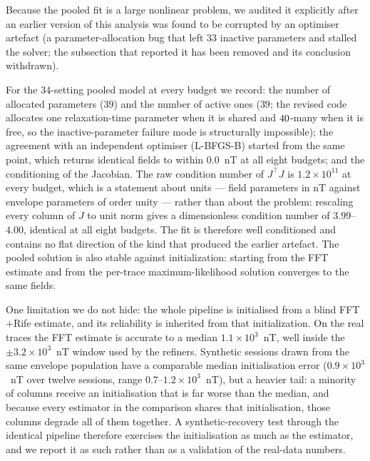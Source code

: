 \documentclass[aps,pra,twocolumn,superscriptaddress,nofootinbib]{revtex4-2}
\begin{document}
Because the pooled fit is a large nonlinear problem, we audited it explicitly after an
earlier version of this analysis was found to be corrupted by an optimiser artefact (a
parameter-allocation bug that left $33$ inactive parameters and stalled the solver; the
subsection that reported it has been removed and its conclusion withdrawn).

For the $34$-setting pooled model at every budget we record: the number of allocated
parameters ($39$) and the number of active ones ($39$; the revised code allocates one
relaxation-time parameter when it is shared and $40$-many when it is free, so the
inactive-parameter failure mode is structurally impossible); the agreement with an
independent optimiser (L-BFGS-B) started from the same point, which returns identical
fields to within $0.0$~nT at all eight budgets; and the conditioning of the
Jacobian. The raw condition number of $J^{\!\top}J$ is $1.2\times10^{11}$ at every budget,
which is a statement about units --- field parameters in nT against envelope parameters of
order unity --- rather than about the problem: rescaling every column of $J$ to unit norm
gives a dimensionless condition number of $3.99$--$4.00$, identical at all eight budgets.
The fit is therefore well conditioned and contains no flat direction of the kind that
produced the earlier artefact. The pooled solution is
also stable against initialization: starting from the FFT estimate and from the per-trace
maximum-likelihood solution converges to the same fields.

One limitation we do not hide: the whole pipeline is initialised from a blind
FFT$+$Rife estimate, and its reliability is inherited from that initialization. On the real
traces the FFT estimate is accurate to a median $1.1\times10^{3}$~nT, well inside the
$\pm3.2\times10^{3}$~nT window used by the refiners. Synthetic sessions drawn from the same envelope population have a
comparable median initialisation error ($0.9\times10^{3}$~nT over twelve sessions, range
$0.7$--$1.2\times10^{3}$~nT), but a heavier tail: a minority of columns receive an
initialisation that is far worse than the median, and because every estimator in the
comparison shares that initialisation, those columns degrade all of them together. A
synthetic-recovery test through the identical pipeline therefore exercises the
initialisation as much as the estimator, and we report it as such rather than as a
validation of the real-data numbers.
\end{document}
